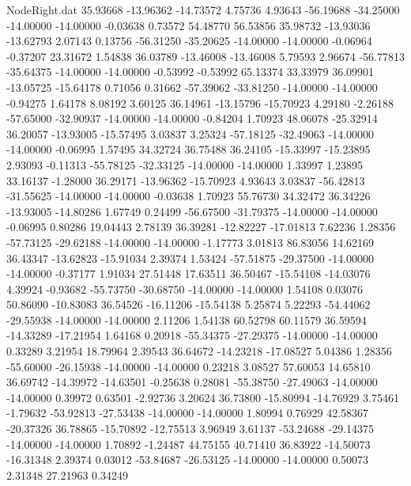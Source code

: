 \begin{filecontents}{NodeRight.dat}
  35.93668  -13.96362  -14.73572     4.75736    4.93643  -56.19688  -34.25000  -14.00000  -14.00000   -0.03638    0.73572   54.48770   56.53856
  35.98732  -13.93036  -13.62793     2.07143    0.13756  -56.31250  -35.20625  -14.00000  -14.00000   -0.06964   -0.37207   23.31672    1.54838
  36.03789  -13.46008  -13.46008     5.79593    2.96674  -56.77813  -35.64375  -14.00000  -14.00000   -0.53992   -0.53992   65.13374   33.33979
  36.09901  -13.05725  -15.64178     0.71056    0.31662  -57.39062  -33.81250  -14.00000  -14.00000   -0.94275    1.64178    8.08192    3.60125
  36.14961  -13.15796  -15.70923     4.29180   -2.26188  -57.65000  -32.90937  -14.00000  -14.00000   -0.84204    1.70923   48.06078  -25.32914
  36.20057  -13.93005  -15.57495     3.03837    3.25324  -57.18125  -32.49063  -14.00000  -14.00000   -0.06995    1.57495   34.32724   36.75488
  36.24105  -15.33997  -15.23895     2.93093   -0.11313  -55.78125  -32.33125  -14.00000  -14.00000    1.33997    1.23895   33.16137   -1.28000
  36.29171  -13.96362  -15.70923     4.93643    3.03837  -56.42813  -31.55625  -14.00000  -14.00000   -0.03638    1.70923   55.76730   34.32472
  36.34226  -13.93005  -14.80286     1.67749    0.24499  -56.67500  -31.79375  -14.00000  -14.00000   -0.06995    0.80286   19.04443    2.78139
  36.39281  -12.82227  -17.01813     7.62236    1.28356  -57.73125  -29.62188  -14.00000  -14.00000   -1.17773    3.01813   86.83056   14.62169
  36.43347  -13.62823  -15.91034     2.39374    1.53424  -57.51875  -29.37500  -14.00000  -14.00000   -0.37177    1.91034   27.51448   17.63511
  36.50467  -15.54108  -14.03076     4.39924   -0.93682  -55.73750  -30.68750  -14.00000  -14.00000    1.54108    0.03076   50.86090  -10.83083
  36.54526  -16.11206  -15.54138     5.25874    5.22293  -54.44062  -29.55938  -14.00000  -14.00000    2.11206    1.54138   60.52798   60.11579
  36.59594  -14.33289  -17.21954     1.64168    0.20918  -55.34375  -27.29375  -14.00000  -14.00000    0.33289    3.21954   18.79964    2.39543
  36.64672  -14.23218  -17.08527     5.04386    1.28356  -55.60000  -26.15938  -14.00000  -14.00000    0.23218    3.08527   57.60053   14.65810
  36.69742  -14.39972  -14.63501    -0.25638    0.28081  -55.38750  -27.49063  -14.00000  -14.00000    0.39972    0.63501   -2.92736    3.20624
  36.73800  -15.80994  -14.76929     3.75461   -1.79632  -53.92813  -27.53438  -14.00000  -14.00000    1.80994    0.76929   42.58367  -20.37326
  36.78865  -15.70892  -12.75513     3.96949    3.61137  -53.24688  -29.14375  -14.00000  -14.00000    1.70892   -1.24487   44.75155   40.71410
  36.83922  -14.50073  -16.31348     2.39374    0.03012  -53.84687  -26.53125  -14.00000  -14.00000    0.50073    2.31348   27.21963    0.34249

\end{filecontents}
